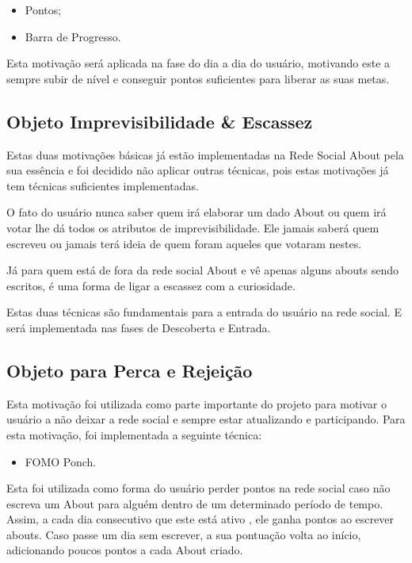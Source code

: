 \begin{itemize}
    \item Pontos;
    \item Barra de Progresso.
\end{itemize}

Esta motivação será aplicada na fase do dia a dia do usuário, motivando este a sempre subir de nível
e conseguir pontos suficientes para liberar as suas metas.


\subsection{Objeto Imprevisibilidade \& Escassez}
\label{sub:objeto_imprevisibilidade}
Estas duas motivações básicas já estão implementadas na Rede Social About pela sua essência e foi
decidido não aplicar outras técnicas, pois estas motivações já tem técnicas suficientes implementadas.

O fato do usuário nunca saber quem irá elaborar um dado About ou quem irá votar lhe dá
todos os atributos de imprevisibilidade. Ele jamais saberá quem escreveu ou jamais terá
ideia de quem foram aqueles que votaram nestes. 

Já para quem está de fora da rede social About e vê apenas alguns abouts sendo escritos, é uma forma
de ligar a escassez com a curiosidade.

Estas duas técnicas são fundamentais para a entrada do usuário na rede social. E será implementada
nas fases de Descoberta e Entrada.

\subsection{Objeto para Perca e Rejeição}
\label{sub:objeto_perca_rejeicao}
Esta motivação foi utilizada como parte importante do projeto para motivar o usuário a não deixar a rede
social e sempre estar atualizando e participando. Para esta motivação, foi implementada a seguinte técnica:

\begin{itemize}
    \item FOMO Ponch.
\end{itemize}

Esta foi utilizada como forma do usuário perder pontos na rede social caso não escreva um About para alguém
dentro de um determinado período de tempo. Assim, a cada dia consecutivo que este está ativo
, ele ganha pontos ao escrever abouts. Caso passe um dia sem escrever, a sua pontuação volta ao início, adicionando
poucos pontos a cada About criado.

